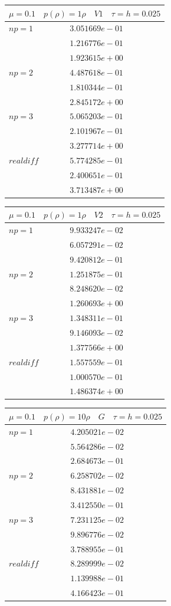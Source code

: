 \documentclass[a4paper,12pt]{extarticle}
\begin{document}
\begin{tabular}{|l|l|}
	\hline
	\multicolumn{2}{|c|}{$\mu =0.1 \quad  p(\rho) =1 \rho \quad V1 \quad\tau = h = 0.025$}\\
	\hline
	$ np = 1$  & $3.051669e-01$\\
	& $1.216776e-01$\\
	& $1.923615e+00$\\
	\hline
	$ np = 2$  & $4.487618e-01$\\
	& $1.810344e-01$\\
	& $2.845172e+00$\\
	\hline
	$ np = 3$  & $5.065203e-01$\\
	& $2.101967e-01$\\
	& $3.277714e+00$\\
	\hline
	$ real diff $  & $5.774285e-01$\\
	& $2.400651e-01$\\
	& $3.713487e+00$\\
	\hline
\end{tabular}

\begin{tabular}{|l|l|}
	\hline
	\multicolumn{2}{|c|}{$\mu =0.1 \quad  p(\rho) =1 \rho \quad V2 \quad\tau = h = 0.025$}\\
	\hline
	$ np = 1$  & $9.933247e-02$\\
	& $6.057291e-02$\\
	& $9.420812e-01$\\
	\hline
	$ np = 2$  & $1.251875e-01$\\
	& $8.248620e-02$\\
	& $1.260693e+00$\\
	\hline
	$ np = 3$  & $1.348311e-01$\\
	& $9.146093e-02$\\
	& $1.377566e+00$\\
	\hline
	$ real diff $  & $1.557559e-01$\\
	& $1.000570e-01$\\
	& $1.486374e+00$\\
	\hline
\end{tabular}

\begin{tabular}{|l|l|}
	\hline
	\multicolumn{2}{|c|}{$\mu =0.1 \quad  p(\rho) =10 \rho \quad G \quad\tau = h = 0.025$}\\
	\hline
	$ np = 1$  & $4.205021e-02$\\
	& $5.564286e-02$\\
	& $2.684673e-01$\\
	\hline
	$ np = 2$  & $6.258702e-02$\\
	& $8.431881e-02$\\
	& $3.412550e-01$\\
	\hline
	$ np = 3$  & $7.231125e-02$\\
	& $9.896776e-02$\\
	& $3.788955e-01$\\
	\hline
	$ real diff $  & $8.289999e-02$\\
	& $1.139988e-01$\\
	& $4.166423e-01$\\
	\hline
\end{tabular}
\end{document}
